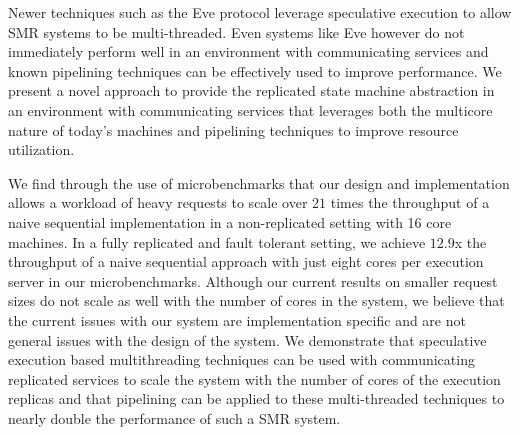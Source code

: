 \documentclass[11pt, oneside]{report}
\begin{document}
Newer techniques such as the Eve protocol \cite{eve} leverage speculative execution to allow SMR systems to be multi-threaded.
Even systems like Eve however do not immediately perform well in an environment with communicating services and known pipelining techniques can be effectively used to improve performance.
We present a novel approach to provide the replicated state machine abstraction in an environment with communicating services that leverages both the multicore nature of today's machines and pipelining techniques to improve resource utilization. 

We find through the use of microbenchmarks that our design and implementation allows a workload of heavy requests to scale over $21$ times the throughput of a naive sequential implementation in a non-replicated setting with 16 core machines.
In a fully replicated and fault tolerant setting, we achieve $12.9$x the throughput of a naive sequential approach with just eight cores per execution server in our microbenchmarks.
Although our current results on smaller request sizes do not scale as well with the number of cores in the system, we believe that the current issues with our system are implementation specific and are not general issues with the design of the system.
We demonstrate that speculative execution based multithreading techniques can be used with communicating replicated services to scale the system with the number of cores of the execution replicas and that pipelining can be applied to these multi-threaded techniques to nearly double the performance of such a SMR system.



\end{document}
